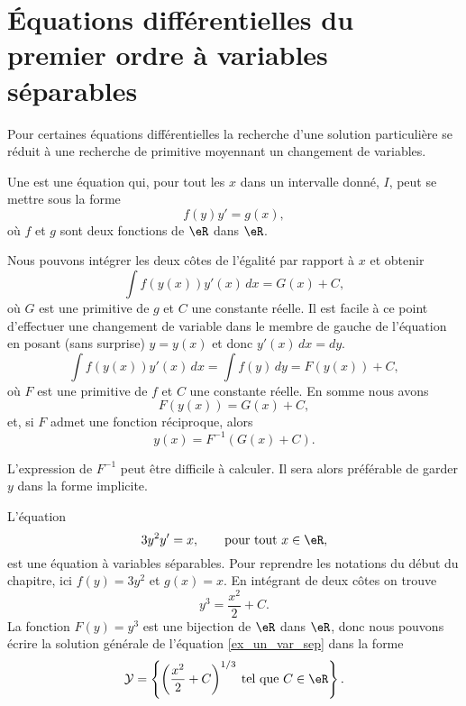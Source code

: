\section{Équations différentielles du premier ordre à variables séparables}

Pour certaines équations différentielles la recherche d'une solution particulière se réduit à une recherche de primitive moyennant un changement de variables.
\begin{definition}
Une   est une équation qui, pour tout les \(x\) dans un intervalle donné, \(I\), peut se mettre sous la forme
\begin{equation}\label{eq_var_sep}
  f(y)y' = g(x),
\end{equation}
o\`u \(f\) et \(g\) sont deux fonctions de \(\eR\) dans \(\eR\).
\end{definition}
Nous pouvons intégrer les deux côtes de l'égalité par rapport à \(x\) et obtenir
\[
  \int f(y(x))y'(x)\, dx = G(x)+C,
\]
o\`u $G$ est une primitive de $g$ et $C$ une constante réelle. Il est facile \`a ce point d'effectuer une changement de variable dans le membre de gauche de l'équation en posant (sans surprise) \(y= y(x)\) et donc \(y'(x)\,dx = dy\).
\[
  \int f(y(x))y'(x)\, dx =  \int f(y)\, dy  = F(y(x)) + C ,
\]
o\`u $F$ est une primitive de $f$ et $C$ une constante réelle. En somme nous avons
\[
  F(y(x)) = G(x) + C ,
\]
et, si $F$ admet une fonction réciproque, alors
\begin{equation}
  y(x) = F^{-1} (G(x)+C).
\end{equation}
\begin{remark}
  L'expression de $F^{-1} $ peut être difficile à calculer. Il sera alors préférable de garder $y$ dans la forme implicite.
\end{remark}

\begin{example}
  L'équation
  \begin{equation}\label{ex_un_var_sep}
    3y^2 y' = x, \qquad\text{pour tout } x\in\eR,
  \end{equation}
est une équation à variables séparables. Pour reprendre les notations du début du chapitre, ici \(f(y) = 3y^2\) et \(g(x) = x\). En intégrant de deux côtes on trouve
\[
y^3 = \frac{x^2}{2} + C .
\]
La fonction $F(y) = y^3$ est une bijection de $\eR$ dans $\eR$, donc nous pouvons écrire la solution générale de l'équation \eqref{ex_un_var_sep} dans la forme
\[
\mathcal{Y} =\left\{ \left(\frac{x^2}{2} + C \right)^{1/3} \:\text{tel que } C\in\eR\right\}.
\]
\end{example}

